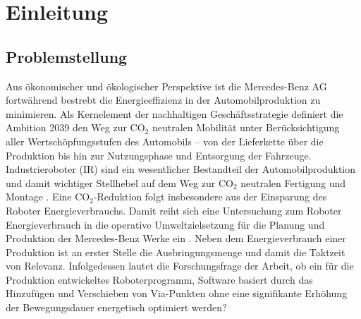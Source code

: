 \chapter{Einleitung}
\label{cha:Einleitung}

\section{Problemstellung}
Aus ökonomischer und ökologischer Perspektive ist die Mercedes-Benz AG fortwährend bestrebt die Energieeffizienz in der Automobilproduktion  zu minimieren. Als Kernelement der nachhaltigen Geschäftsstrategie definiert die Ambition 2039 den Weg zur $\text{CO}_2$ neutralen Mobilität unter Berücksichtigung aller \glqq Wertschöpfungsstufen des Automobils – von der Lieferkette über die Produktion bis hin zur Nutzungsphase und Entsorgung der Fahrzeuge\grqq \cite[S.~15]{Stapmanns.2022}. Industrieroboter  (IR) sind ein wesentlicher Bestandteil der Automobilproduktion und damit wichtiger Stellhebel auf dem Weg zur $\text{CO}_2$ neutralen Fertigung und Montage \cite{Maschinenbau.2023}.  Eine $\text{CO}_2$-Reduktion folgt insbesondere aus der Einsparung des Roboter Energieverbrauchs. Damit reiht sich eine Untersuchung zum  Roboter Energieverbrauch in die operative Umweltzielsetzung für die Planung und Produktion der Mercedes-Benz Werke ein \cite[S.~21]{Stapmanns.2022}. Neben dem Energieverbrauch einer Produktion ist an erster Stelle die Ausbringungsmenge und damit die Taktzeit von Relevanz. Infolgedessen lautet die Forschungsfrage der Arbeit, ob ein für die Produktion entwickeltes Roboterprogramm, Software basiert durch das Hinzufügen und Verschieben von Via-Punkten ohne eine signifikante Erhöhung der Bewegungsdauer energetisch optimiert werden? 
% 
